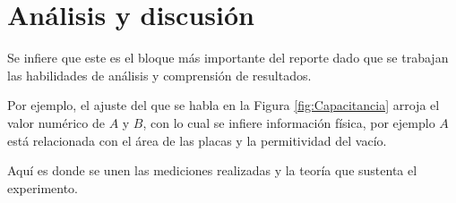 \section*{Análisis y discusión}
\label{sec:Analisis}

Se infiere que este es el bloque más importante del reporte dado que se trabajan las habilidades de análisis y comprensión de resultados.

Por ejemplo, el ajuste del que se habla en la Figura \ref{fig:Capacitancia} arroja el valor numérico de $ A $ y $ B $, con lo cual se infiere información física, por ejemplo $ A $ está relacionada con el área de las placas y la permitividad del vacío. 

Aquí es donde se unen las mediciones realizadas y la teoría que sustenta el experimento.